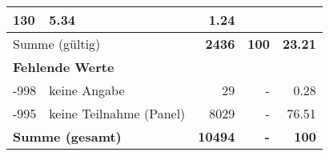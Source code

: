 \begin{longtable}{lXrrr}
       \num{130} &
       \num[round-mode=places,round-precision=2]{5,34} &
         \num[round-mode=places,round-precision=2]{1,24} \\
     \midrule
     \multicolumn{2}{l}{Summe (gültig)} &
       \textbf{\num{2436}} &
     \textbf{100} &
       \textbf{\num[round-mode=places,round-precision=2]{23,21}} \\
     \multicolumn{5}{l}{\textbf{Fehlende Werte}}\\
       -998 &
       keine Angabe &
         \num{29} &
        - &
         \num[round-mode=places,round-precision=2]{0,28} \\
       -995 &
       keine Teilnahme (Panel) &
         \num{8029} &
        - &
         \num[round-mode=places,round-precision=2]{76,51} \\
     \midrule
     \multicolumn{2}{l}{\textbf{Summe (gesamt)}} &
          \textbf{\num{10494}} &
        \textbf{-} &
        \textbf{100} \\
     \bottomrule
     \end{longtable}
     
